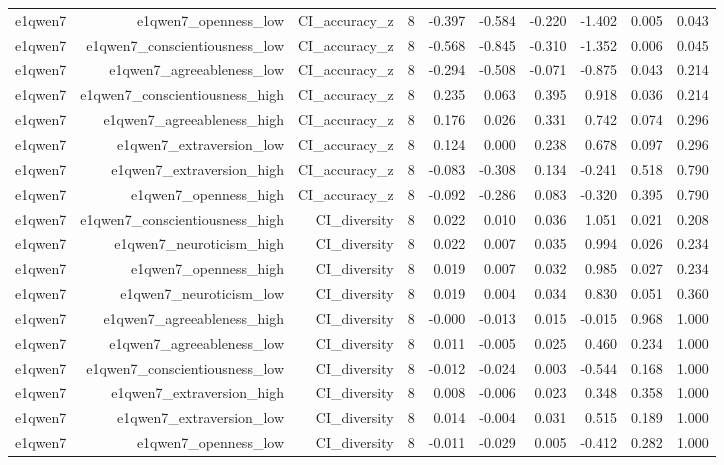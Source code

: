 \documentclass[11pt]{article}
\begin{document}
\begin{landscape}
\begin{longtable}{@{}lrrrrrrrrr@{}}
e1qwen7 & e1qwen7\_openness\_low & CI\_accuracy\_z & 8 & -0.397 & -0.584 & -0.220 & -1.402 & 0.005 & 0.043 \\
e1qwen7 & e1qwen7\_conscientiousness\_low & CI\_accuracy\_z & 8 & -0.568 & -0.845 & -0.310 & -1.352 & 0.006 & 0.045 \\
e1qwen7 & e1qwen7\_agreeableness\_low & CI\_accuracy\_z & 8 & -0.294 & -0.508 & -0.071 & -0.875 & 0.043 & 0.214 \\
e1qwen7 & e1qwen7\_conscientiousness\_high & CI\_accuracy\_z & 8 & 0.235 & 0.063 & 0.395 & 0.918 & 0.036 & 0.214 \\
e1qwen7 & e1qwen7\_agreeableness\_high & CI\_accuracy\_z & 8 & 0.176 & 0.026 & 0.331 & 0.742 & 0.074 & 0.296 \\
e1qwen7 & e1qwen7\_extraversion\_low & CI\_accuracy\_z & 8 & 0.124 & 0.000 & 0.238 & 0.678 & 0.097 & 0.296 \\
e1qwen7 & e1qwen7\_extraversion\_high & CI\_accuracy\_z & 8 & -0.083 & -0.308 & 0.134 & -0.241 & 0.518 & 0.790 \\
e1qwen7 & e1qwen7\_openness\_high & CI\_accuracy\_z & 8 & -0.092 & -0.286 & 0.083 & -0.320 & 0.395 & 0.790 \\
e1qwen7 & e1qwen7\_conscientiousness\_high & CI\_diversity & 8 & 0.022 & 0.010 & 0.036 & 1.051 & 0.021 & 0.208 \\
e1qwen7 & e1qwen7\_neuroticism\_high & CI\_diversity & 8 & 0.022 & 0.007 & 0.035 & 0.994 & 0.026 & 0.234 \\
e1qwen7 & e1qwen7\_openness\_high & CI\_diversity & 8 & 0.019 & 0.007 & 0.032 & 0.985 & 0.027 & 0.234 \\
e1qwen7 & e1qwen7\_neuroticism\_low & CI\_diversity & 8 & 0.019 & 0.004 & 0.034 & 0.830 & 0.051 & 0.360 \\
e1qwen7 & e1qwen7\_agreeableness\_high & CI\_diversity & 8 & -0.000 & -0.013 & 0.015 & -0.015 & 0.968 & 1.000 \\
e1qwen7 & e1qwen7\_agreeableness\_low & CI\_diversity & 8 & 0.011 & -0.005 & 0.025 & 0.460 & 0.234 & 1.000 \\
e1qwen7 & e1qwen7\_conscientiousness\_low & CI\_diversity & 8 & -0.012 & -0.024 & 0.003 & -0.544 & 0.168 & 1.000 \\
e1qwen7 & e1qwen7\_extraversion\_high & CI\_diversity & 8 & 0.008 & -0.006 & 0.023 & 0.348 & 0.358 & 1.000 \\
e1qwen7 & e1qwen7\_extraversion\_low & CI\_diversity & 8 & 0.014 & -0.004 & 0.031 & 0.515 & 0.189 & 1.000 \\
e1qwen7 & e1qwen7\_openness\_low & CI\_diversity & 8 & -0.011 & -0.029 & 0.005 & -0.412 & 0.282 & 1.000 \\

\end{longtable}
\end{landscape}
\end{document}
